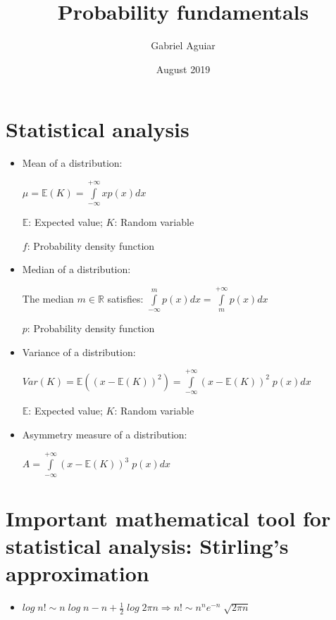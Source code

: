 \documentclass{article}
\title{Probability fundamentals}
\author{Gabriel Aguiar}
\date{August 2019}
\begin{document}
\maketitle

\section{Statistical analysis}

\begin{itemize}

\item Mean of a distribution:

$\mu = \mathbb{E}(K) = \int\limits_{-\infty}^{+\infty} x p(x) dx$

$\mathbb{E}$: Expected value; $K$: Random variable

$f$: Probability density function

\item Median of a distribution:

The median $m \in \mathbb{R}$ satisfies: $\int\limits_{-\infty}^{m} p(x) dx = \int\limits_{m}^{+\infty} p(x) dx$

$p$: Probability density function

\item Variance of a distribution:

$Var(K) = \mathbb{E}((x - \mathbb{E}(K))^{2}) = \int\limits_{-\infty}^{+\infty} (x - \mathbb{E}(K))^{2} \; p(x) dx$

$\mathbb{E}$: Expected value; $K$: Random variable

\item Asymmetry measure of a distribution:

$A = \int\limits_{-\infty}^{+\infty} (x - \mathbb{E}(K))^{3} \; p(x) dx$
        
\end{itemize}

\section{Important mathematical tool for statistical analysis: Stirling's approximation}

\begin{itemize}

\item $log \; n! \sim n \; log \; n - n + \frac{1}{2} \; log \; 2 \pi n \Rightarrow n! \sim n^{n} e^{-n} \; \sqrt{2 \pi n}$

\end{itemize}
\end{document}
